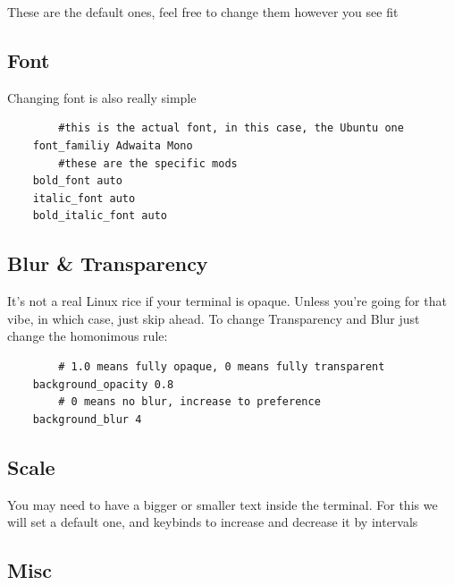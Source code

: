 These are the default ones, feel free to change them however you see fit

\subsection{Font}
Changing font is also really simple

\begin{lstlisting}
        #this is the actual font, in this case, the Ubuntu one
    font_familiy Adwaita Mono
        #these are the specific mods
    bold_font auto
    italic_font auto
    bold_italic_font auto
\end{lstlisting}

\subsection{Blur \& Transparency}
It's not a real Linux rice if your terminal is opaque. Unless you're going for that vibe, in which case, just skip ahead.
To change Transparency and Blur just change the homonimous rule:
\begin{lstlisting}
        # 1.0 means fully opaque, 0 means fully transparent
    background_opacity 0.8
        # 0 means no blur, increase to preference
    background_blur 4
\end{lstlisting}

\subsection{Scale}
You may need to have a bigger or smaller text inside the terminal. For this we will set a default one, and keybinds to increase and decrease it by intervals

\subsection{Misc}
